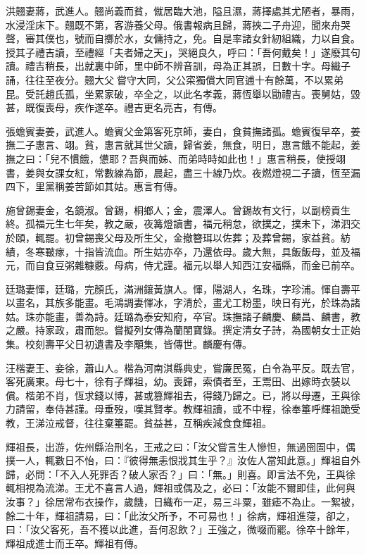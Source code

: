 \begin{pinyinscope}
洪翹妻蔣，武進人。翹尚義而貧，僦居臨大池，隘且濕，蔣擇處其尤陋者，暴雨，水浸淫床下。翹既不第，客游養父母。俄書報病且歸，蔣挾二子舟迎，聞來舟哭聲，審其僕也，號而自擲於水，女傭持之，免。自是率諸女針紉組織，力以自食。授其子禮吉讀，至禮經「夫者婦之天」，哭絕良久，呼曰：「吾何戴矣！」遂廢其句讀。禮吉稍長，出就裏中師，里中師不辨音訓，母為正其誤，日數十字。母織子誦，往往至夜分。翹大父嘗守大同，父公寀獨償大同官逋十有餘萬，不以累弟昆。受託趙氏孤，坐累家破，卒全之，以此名孝義，蔣恆舉以勖禮吉。喪舅姑，毀甚，既復喪母，疾作遂卒。禮吉更名亮吉，有傳。

張蟾賓妻姜，武進人。蟾賓父金第客死京師，妻白，食貧撫諸孤。蟾賓復早卒，姜撫二子惠言、翊。貧，惠言就其世父讀，歸省姜，無食，明日，惠言餓不能起，姜撫之曰：「兒不慣餓，憊耶？吾與而姊、而弟時時如此也！」惠言稍長，使授翊書，姜與女課女紅，常數線為節，晨起，盡三十線乃炊。夜燃燈視二子讀，恆至漏四下，里黨稱姜苦節如其姑。惠言有傳。

施曾錫妻金，名鏡淑。曾錫，桐鄉人；金，震澤人。曾錫故有文行，以副榜貢生終。孤福元生七年矣，教之嚴，夜篝燈讀書，福元稍怠，欲撲之，撲未下，涕泗交於頤，輒罷。初曾錫喪父母及所生父，金撤簪珥以佐葬；及葬曾錫，家益貧。紡績，冬寒皸瘃，十指皆流血。所生姑亦卒，乃還依母。歲大無，具飯飯母，並及福元，而自食豆粥雜糠覈。母病，侍尤謹。福元以舉人知西江安福縣，而金已前卒。

廷璐妻惲，廷璐，完顏氏，滿洲鑲黃旗人。惲，陽湖人，名珠，字珍浦。惲自壽平以畫名，其族多能畫。毛鴻調妻惲冰，字清於，畫尤工粉墨，映日有光，於珠為諸姑。珠亦能畫，善為詩。廷璐為泰安知府，卒官。珠撫諸子麟慶、麟昌、麟書，教之嚴。持家政，肅而恕。嘗擬列女傳為蘭閨寶錄。撰定清女子詩，為國朝女士正始集。校刻壽平父日初遺書及李顒集，皆傳世。麟慶有傳。

汪楷妻王、妾徐，蕭山人。楷為河南淇縣典史，嘗廉民冤，白令為平反。既去官，客死廣東。母七十，徐有子輝祖，幼。喪歸，索債者至，王鬻田、出嫁時衣裝以償。楷弟不肖，恆求錢以博，甚或篡輝祖去，得錢乃歸之。已，將以母遷，王與徐力請留，奉侍甚謹。母垂歿，嘆其賢孝。教輝祖讀，或不中程，徐奉箠呼輝祖跪受教，王涕泣戒督，往往棄箠罷。貧益甚，互稱疾減食食輝祖。

輝祖長，出游，佐州縣治刑名，王戒之曰：「汝父嘗言生人慘怛，無過囹圄中，偶撲一人，輒數日不怡，曰：『彼得無恚恨戕其生乎？』汝佐人當知此意。」輝祖自外歸，必問：「不入人死罪否？破人家否？」曰：「無。」則喜。即言法不免，王與徐輒相視為流涕。王尤不喜言人過，輝祖或偶及之，必曰：「汝能不爾即佳，此何與汝事？」徐居常布衣操作，歲饑，日織布一疋，易三斗粟，雖瘧不為止。一絮被，餘二十年，輝祖請易，曰：「此汝父所予，不可易也！」徐病，輝祖進蓡，卻之，曰：「汝父客死，吾不獲以此進，吾何忍飲？」王強之，微啜而罷。徐卒十餘年，輝祖成進士而王卒。輝祖有傳。


\end{pinyinscope}
